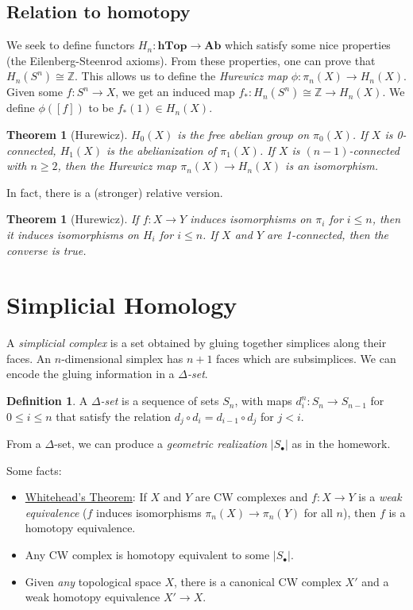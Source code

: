 \documentclass[12pt]{article}
\theoremstyle{plain}
\newtheorem{theorem}[equation]{Theorem}
\theoremstyle{definition}
\newtheorem{definition}[equation]{Definition}
\theoremstyle{remark}
\newcommand{\ZZ}{\ensuremath{\mathbb{Z}}}
\begin{document}
 \subsection*{Relation to homotopy}
 We seek to define functors $H_n:\textbf{hTop}\to \textbf{Ab}$ which satisfy some nice
 properties (the Eilenberg-Steenrod axioms). From these properties, one can prove that
 $H_n(S^n)\cong \ZZ$. This allows us to define the \emph{Hurewicz map} $\phi:\pi_n(X)\to
 H_n(X)$. Given some $f:S^n\to X$, we get an induced map $f_*:H_n(S^n)\cong \ZZ\to
 H_n(X)$. We define $\phi([f])$ to be $f_*(1)\in H_n(X)$.
 \begin{theorem}[Hurewicz]
   $H_0(X)$ is the free abelian group on $\pi_0(X)$. If $X$ is 0-connected, $H_1(X)$ is
   the abelianization of $\pi_1(X)$. If $X$ is $(n-1)$-connected with $n\ge 2$, then the
   Hurewicz map $\pi_n(X)\to H_n(X)$ is an isomorphism.
 \end{theorem}
 In fact, there is a (stronger) relative version.
 \begin{theorem}[Hurewicz]
   If $f:X\to Y$ induces isomorphisms on $\pi_i$ for $i\le n$, then it induces
   isomorphisms on $H_i$ for $i\le n$. If $X$ and $Y$ are 1-connected, then the converse
   is true.
 \end{theorem}

 \section{Simplicial Homology}


 A \emph{simplicial complex} is a set obtained by gluing together simplices along their
 faces. An $n$-dimensional simplex has $n+1$ faces which are subsimplices. We can encode
 the gluing information in a \emph{$\Delta$-set}.
 \begin{definition}
   A \emph{$\Delta$-set} is a sequence of sets $S_n$, with maps $d^n_i:S_n\to S_{n-1}$
   for $0\le i\le n$ that satisfy the relation $d_j\circ d_i = d_{i-1}\circ d_j$ for
   $j<i$.
 \end{definition}
 From a $\Delta$-set, we can produce a \emph{geometric realization} $|S_\bullet|$ as in
 the homework.

 Some facts:
 \begin{itemize}
   \item \underline{Whitehead's Theorem}: If $X$ and $Y$ are CW complexes and $f:X\to Y$
   is a \emph{weak equivalence} ($f$ induces isomorphisms $\pi_n(X)\to \pi_n(Y)$ for all
   $n$), then $f$ is a homotopy equivalence.
   \item Any CW complex is homotopy equivalent to some $|S_\bullet|$.
   \item Given \emph{any} topological space $X$, there is a canonical CW complex $X'$ and
   a weak homotopy equivalence $X'\to X$.
 \end{itemize}
\end{document}
